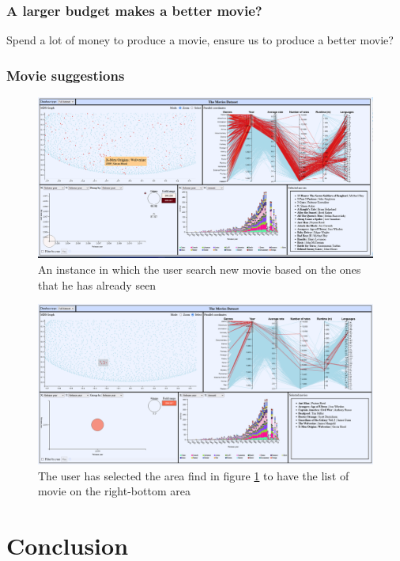 \documentclass[]{article}
\begin{document}
\subsubsection{A larger budget makes a better movie?}
Spend a lot of money to produce a movie, ensure us to produce a better movie?
\subsubsection{Movie suggestions}
\begin{figure}[H]
	\centering
	\includegraphics[width=1\linewidth]{images/insights_suggestion1}
	\caption{An instance in which the user search new movie based on the ones that he has already seen}
	\label{fig:insightssuggestion}
\end{figure}
\begin{figure}[H]
	\centering
	\includegraphics[width=1\linewidth]{images/insights_suggestion2}
	\caption{The user has selected the area find in figure \ref{fig:insightssuggestion} to have the list of movie on the right-bottom area}
	\label{fig:insightssuggestion2}
\end{figure}



\section{Conclusion}
\end{document}
